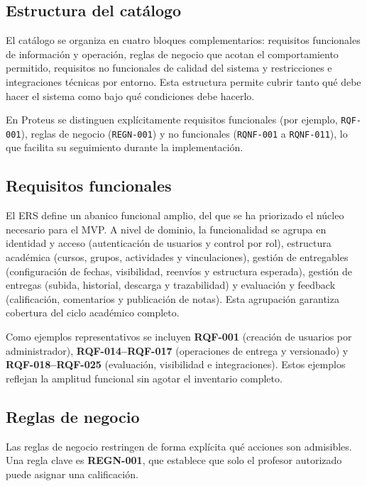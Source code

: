 \subsection{Estructura del cat\'alogo}

El cat\'alogo se organiza en cuatro bloques complementarios: requisitos funcionales de informaci\'on y operaci\'on, reglas de negocio que acotan el comportamiento permitido, requisitos no funcionales de calidad del sistema y restricciones e integraciones t\'ecnicas por entorno. Esta estructura permite cubrir tanto qu\'e debe hacer el sistema como bajo qu\'e condiciones debe hacerlo.

En Proteus se distinguen expl\'icitamente requisitos funcionales (por ejemplo,
\texttt{RQF-001}), reglas de negocio (\texttt{REGN-001}) y no funcionales
(\texttt{RQNF-001} a \texttt{RQNF-011}), lo que facilita su seguimiento
durante la implementaci\'on.

\subsection{Requisitos funcionales}

El ERS define un abanico funcional amplio, del que se ha priorizado el n\'ucleo
necesario para el MVP. A nivel de dominio, la funcionalidad se agrupa en identidad y acceso (autenticaci\'on de usuarios y control por rol), estructura acad\'emica (cursos, grupos, actividades y vinculaciones), gesti\'on de entregables (configuraci\'on de fechas, visibilidad, reenv\'ios y estructura esperada), gesti\'on de entregas (subida, historial, descarga y trazabilidad) y evaluaci\'on y feedback (calificaci\'on, comentarios y publicaci\'on de notas). Esta agrupaci\'on garantiza cobertura del ciclo acad\'emico completo.

Como ejemplos representativos se incluyen \textbf{RQF-001} (creaci\'on de usuarios por administrador), \textbf{RQF-014--RQF-017} (operaciones de entrega y versionado) y \textbf{RQF-018--RQF-025} (evaluaci\'on, visibilidad e integraciones). Estos ejemplos reflejan la amplitud funcional sin agotar el inventario completo.

\subsection{Reglas de negocio}

Las reglas de negocio restringen de forma expl\'icita qu\'e acciones son admisibles.
Una regla clave es \textbf{REGN-001}, que establece que solo el profesor
autorizado puede asignar una calificaci\'on.

